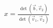 \documentclass[preview]{standalone}
\begin{document}
\begin{align*}
x = \frac{\det(\vec{b}, \vec{v}_2)}{\det(\vec{v}_1, \vec{v}_2)}
\end{align*}
\end{document}
